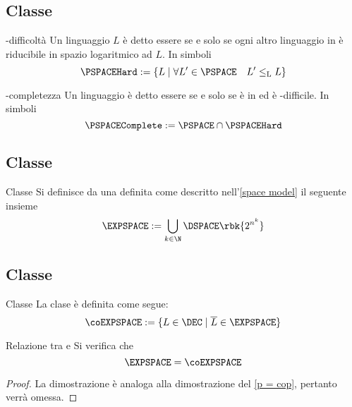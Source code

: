 \documentclass[a4paper, 12pt]{report}
\begin{document}
    \subsection{Classe \PSPACEComplete}

    \begin{frameddefn}{\PSPACE-difficoltà}
        Un linguaggio $L$ è detto essere  se e solo se ogni altro linguaggio in \PSPACE è riducibile in spazio logaritmico ad $L$. In simboli $$\PSPACEHard := \{L \mid \forall L' \in \PSPACE \quad L' \leq_\mathrm L L\}$$
    \end{frameddefn}

    \begin{frameddefn}{\PSPACE-completezza}
        Un linguaggio è detto essere  se e solo se è in \PSPACE ed è \PSPACE-difficile. In simboli $$\PSPACEComplete := \PSPACE \cap \PSPACEHard$$
    \end{frameddefn}

    \subsection{Classe \EXPSPACE}

    \begin{frameddefn}{Classe \EXPSPACE}
        Si definisce  da una \TM definita come descritto nell'\cref{space model} il seguente insieme $$\EXPSPACE := \displaystyle \bigcup_{k \in \N}{\DSPACE \rbk{2^{n^k}}}$$
    \end{frameddefn}

    \subsection{Classe \coEXPSPACE}

    \begin{frameddefn}{Classe \coEXPSPACE}
        La clase \coEXPSPACE è definita come segue: $$\coEXPSPACE := \{L \in \DEC \mid \overline L \in \EXPSPACE\}$$
    \end{frameddefn}

    \begin{framedthm}[label={expspace = coexpspace}]{Relazione tra \EXPSPACE e \coEXPSPACE}
        Si verifica che $$\EXPSPACE = \coEXPSPACE$$
    \end{framedthm}

    \begin{proof}
        La dimostrazione è analoga alla dimostrazione del \cref{p = cop}, pertanto verrà omessa.
    \end{proof}
\end{document}
